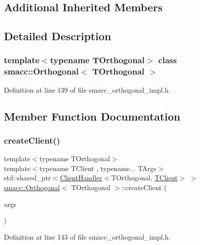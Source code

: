 \subsection*{Additional Inherited Members}


\subsection{Detailed Description}
\subsubsection*{template$<$typename T\+Orthogonal$>$\newline
class smacc\+::\+Orthogonal$<$ T\+Orthogonal $>$}



Definition at line 139 of file smacc\+\_\+orthogonal\+\_\+impl.\+h.



\subsection{Member Function Documentation}
\mbox{\label{classsmacc_1_1Orthogonal_aea19bfe584fe9c9580784a24b4690eab}} 
\subsubsection{\texorpdfstring{create\+Client()}{createClient()}}
{\footnotesize\ttfamily template$<$typename T\+Orthogonal$>$ \\
template$<$typename T\+Client , typename... T\+Args$>$ \\
std\+::shared\+\_\+ptr$<$\hyperlink{classsmacc_1_1ClientHandler}{Client\+Handler}$<$T\+Orthogonal, \hyperlink{classTClient}{T\+Client}$>$ $>$ \hyperlink{classsmacc_1_1Orthogonal}{smacc\+::\+Orthogonal}$<$ T\+Orthogonal $>$\+::create\+Client (\begin{DoxyParamCaption}\item[{T\+Args...}]{args }\end{DoxyParamCaption})\hspace{0.3cm}{\ttfamily [inline]}}



Definition at line 143 of file smacc\+\_\+orthogonal\+\_\+impl.\+h.


